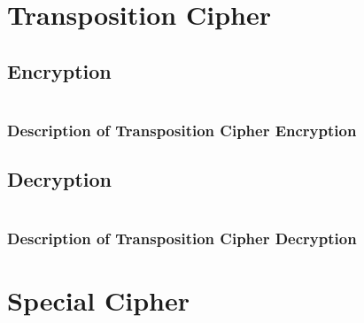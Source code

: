 \documentclass[a4paper,oneside,11pt]{book}
\begin{document}
\chapter[Transposition Cipher]{Transposition Cipher}
\section{Encryption}
\begin{lstlisting}[language=Csh, caption={Code for Transposition Cipher Encryption}]
\end{lstlisting}

\subsection{Description of Transposition Cipher Encryption}

\section{Decryption}
\begin{lstlisting}[language=Csh, caption={Code for Transposition Cipher Decryption}]
\end{lstlisting}

\subsection{Description of Transposition Cipher Decryption}

\chapter[Special Cipher]{Special Cipher}
\end{document}
